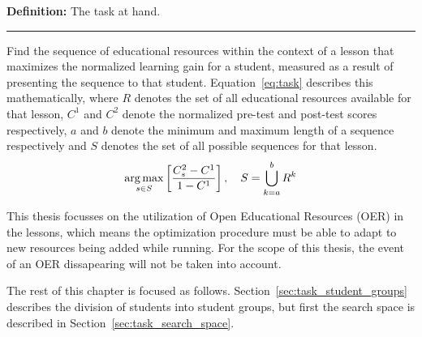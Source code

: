 \begin{framed}\noindent
\textbf{{\large Definition:}} The task at hand. \vspace{0.5\onelineskip} \hrule
\vspace{\baselineskip}\noindent
Find the sequence of educational resources within the context of a lesson that
maximizes the normalized learning gain for a student, measured as a
result of presenting the sequence to that student.
Equation~\eqref{eq:task} describes this mathematically, where $R$ denotes the
set of all educational resources available for that lesson, $C^1$ and $C^2$
denote the normalized pre-test and post-test scores respectively, $a$ and $b$
denote the minimum and maximum length of a sequence respectively and $S$
denotes the set of all possible sequences for that lesson.\noindent
\begin{equation}
	\label{eq:task}
	\operatorname*{arg\,max}_{s \in S} \left[ \frac{C^2_s-C^1}{1-C^1} \right],
	\quad S = \bigcup_{k = a}^{b} R^k
\end{equation}
\end{framed}

This thesis focusses on the utilization of Open Educational Resources (OER) in the
lessons, which means the optimization procedure must be able to adapt to new
resources being added while running. For the scope of this thesis, the event of
an OER dissapearing will not be taken into account.

The rest of this chapter is focused as follows.
Section~\ref{sec:task_student_groups} describes the division of students into
student groups, but first the search space is described in
Section~\ref{sec:task_search_space}.

